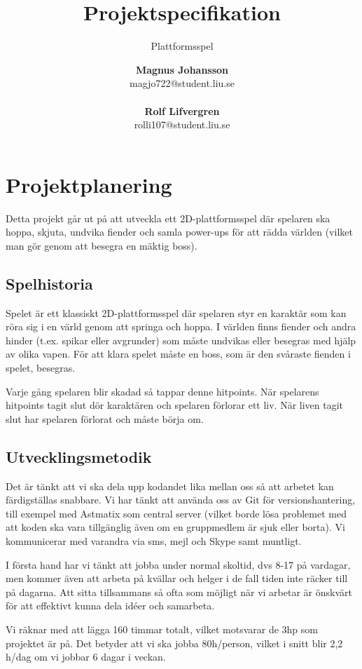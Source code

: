 \documentclass{scrartcl}
\author{\textbf{Magnus Johansson}\\
		magjo722@student.liu.se\\ \\
		\textbf{Rolf Lifvergren}\\
		rolli107@student.liu.se}
\title{Projektspecifikation}
\subtitle{Plattformsspel}
\begin{document}
\maketitle
\clearpage

\section{Projektplanering}
Detta projekt går ut på att utveckla ett 2D-plattformsspel där spelaren ska hoppa, skjuta, undvika fiender och samla power-ups för att rädda världen (vilket man gör genom att besegra en mäktig boss).

\subsection{Spelhistoria}
Spelet är ett klassiskt 2D-plattformsspel där spelaren styr en karaktär som kan röra sig i en värld genom att springa och hoppa. I världen finns fiender och andra hinder (t.ex. spikar eller avgrunder) som måste undvikas eller besegras med hjälp av olika vapen. För att klara spelet måste en boss, som är den svåraste fienden i spelet, besegras.

Varje gång spelaren blir skadad så tappar denne hitpoints. När spelarens hitpoints tagit slut dör karaktären och spelaren förlorar ett liv. När liven tagit slut har spelaren förlorat och måste börja om. 

\subsection{Utvecklingsmetodik}\label{utvecklingsmetodik}
Det är tänkt att vi ska dela upp kodandet lika mellan oss så att arbetet kan färdigställas snabbare. Vi har tänkt att använda oss av Git för versionshantering, till exempel med Astmatix som central server (vilket borde lösa problemet med att koden ska vara tillgänglig även om en gruppmedlem är sjuk eller borta). Vi kommunicerar med varandra via sms, mejl och Skype samt muntligt.

I första hand har vi tänkt att jobba under normal skoltid, dvs 8-17 på vardagar, men kommer även att arbeta på kvällar och helger i de fall tiden inte räcker till på dagarna. Att sitta tillsammans så ofta som möjligt när vi arbetar är önskvärt för att effektivt kunna dela idéer och samarbeta.

Vi räknar med att lägga 160 timmar totalt, vilket motsvarar de 3hp som projektet är på. Det betyder att vi ska jobba 80h/person, vilket i snitt blir 2{,}2 h/dag om vi jobbar 6 dagar i veckan.
\end{document}
